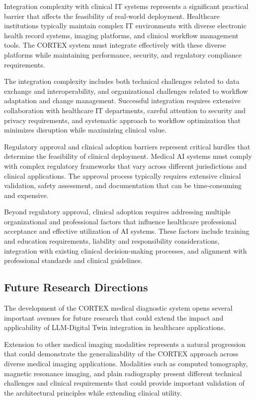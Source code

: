 Integration complexity with clinical IT systems represents a significant practical barrier that affects the feasibility of real-world deployment. Healthcare institutions typically maintain complex IT environments with diverse electronic health record systems, imaging platforms, and clinical workflow management tools. The CORTEX system must integrate effectively with these diverse platforms while maintaining performance, security, and regulatory compliance requirements.

The integration complexity includes both technical challenges related to data exchange and interoperability, and organizational challenges related to workflow adaptation and change management. Successful integration requires extensive collaboration with healthcare IT departments, careful attention to security and privacy requirements, and systematic approach to workflow optimization that minimizes disruption while maximizing clinical value.

Regulatory approval and clinical adoption barriers represent critical hurdles that determine the feasibility of clinical deployment. Medical AI systems must comply with complex regulatory frameworks that vary across different jurisdictions and clinical applications. The approval process typically requires extensive clinical validation, safety assessment, and documentation that can be time-consuming and expensive.

Beyond regulatory approval, clinical adoption requires addressing multiple organizational and professional factors that influence healthcare professional acceptance and effective utilization of AI systems. These factors include training and education requirements, liability and responsibility considerations, integration with existing clinical decision-making processes, and alignment with professional standards and clinical guidelines.

\subsection{Future Research Directions}

The development of the CORTEX medical diagnostic system opens several important avenues for future research that could extend the impact and applicability of LLM-Digital Twin integration in healthcare applications.

Extension to other medical imaging modalities represents a natural progression that could demonstrate the generalizability of the CORTEX approach across diverse medical imaging applications. Modalities such as computed tomography, magnetic resonance imaging, and plain radiography present different technical challenges and clinical requirements that could provide important validation of the architectural principles while extending clinical utility.

